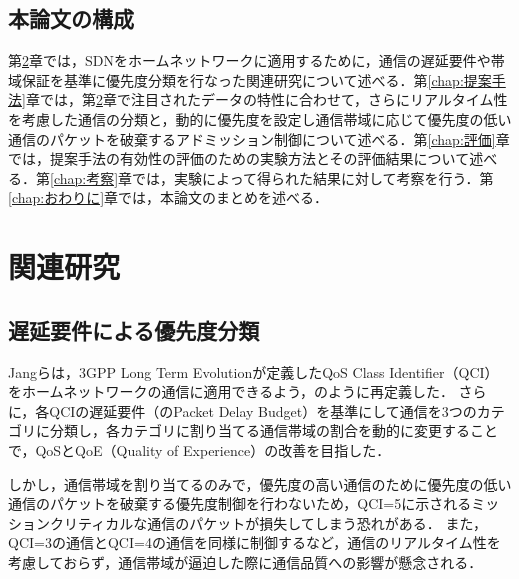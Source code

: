 \documentclass[a4paper,11pt,uplatex]{ujreport}
\begin{document}
\section{本論文の構成}
\label{sec:本論文の構成}

  第\ref{chap:関連研究}章では，SDNをホームネットワークに適用するために，通信の遅延要件や帯域保証を基準に優先度分類を行なった関連研究について述べる．第\ref{chap:提案手法}章では，第\ref{chap:関連研究}章で注目されたデータの特性に合わせて，さらにリアルタイム性を考慮した通信の分類と，動的に優先度を設定し通信帯域に応じて優先度の低い通信のパケットを破棄するアドミッション制御について述べる．第\ref{chap:評価}章では，提案手法の有効性の評価のための実験方法とその評価結果について述べる．第\ref{chap:考察}章では，実験によって得られた結果に対して考察を行う．第\ref{chap:おわりに}章では，本論文のまとめを述べる．


\chapter{関連研究}
\label{chap:関連研究}

\section{遅延要件による優先度分類}
\label{sec:遅延要件による優先度分類}

  Jangらは，3GPP Long Term Evolutionが定義したQoS Class Identifier（QCI）をホームネットワークの通信に適用できるよう，のように再定義した\cite{Framework}．
  さらに，各QCIの遅延要件（のPacket Delay Budget）を基準にして通信を3つのカテゴリに分類し，各カテゴリに割り当てる通信帯域の割合を動的に変更することで，QoSとQoE（Quality of Experience）の改善を目指した．\par
  しかし，通信帯域を割り当てるのみで，優先度の高い通信のために優先度の低い通信のパケットを破棄する優先度制御を行わないため，QCI=5に示されるミッションクリティカルな通信のパケットが損失してしまう恐れがある．
  また，QCI=3の通信とQCI=4の通信を同様に制御するなど，通信のリアルタイム性を考慮しておらず，通信帯域が逼迫した際に通信品質への影響が懸念される．
\end{document}
